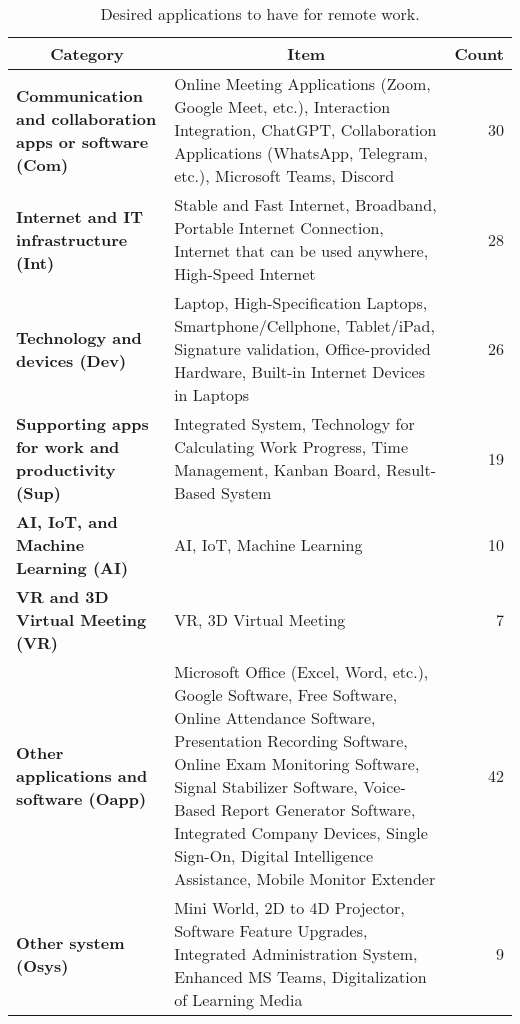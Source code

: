 \documentclass[a4paper, conference]{IEEEtran}
\begin{document}
\begin{table*}
	\centering
	\caption{Desired applications to have for remote work.}
	\label{tab:required_apps_for_remote_work}
	\begin{tabular}{|p{}|p{}|r|}
		\hline
		\multicolumn{1}{|c|}{\textbf{Category}}                                   & \multicolumn{1}{c|}{\textbf{Item}}                                                                                                                                                                                   & \multicolumn{1}{c|}{\textbf{Count}} \\ \hline
		\textbf{Communication  and  collaboration apps or software (Com)} & Online Meeting Applications (Zoom, Google Meet, etc.), Interaction Integration, ChatGPT, Collaboration Applications (WhatsApp, Telegram, etc.), Microsoft Teams, Discord                                                                                     & 30 %
		\\ \hline
		\textbf{Internet and IT infrastructure (Int)} & Stable and Fast Internet, Broadband, Portable Internet Connection, Internet that can be used anywhere, High-Speed Internet & 28 %
		\\ \hline
		\textbf{Technology and devices (Dev)} & Laptop, High-Specification Laptops, Smartphone/Cellphone, Tablet/iPad, Signature validation, Office-provided Hardware, Built-in Internet Devices in Laptops                                                                                                                          & 26 %
		\\ \hline
		\textbf{Supporting apps for work and productivity (Sup)} & Integrated System, Technology for Calculating Work Progress, Time Management, Kanban Board, Result-Based System & 19 %
		\\ \hline
		\textbf{AI, IoT, and  Machine  Learning (AI)} & AI, IoT, Machine Learning
		& 10 %
		\\ \hline
		\textbf{VR and 3D  Virtual Meeting (VR)} & VR, 3D Virtual Meeting & 7%
		\\ \hline
		\textbf{Other applications and software (Oapp)} & Microsoft Office (Excel, Word, etc.), Google Software, Free Software, Online Attendance Software, Presentation Recording Software, Online Exam Monitoring Software, Signal Stabilizer Software, Voice-Based Report Generator Software, Integrated Company Devices, Single Sign-On, Digital Intelligence Assistance, Mobile Monitor Extender & 42 %
		\\ \hline
		\textbf{Other system (Osys)} & Mini World, 2D to 4D Projector, Software Feature Upgrades, Integrated Administration System, Enhanced MS Teams, Digitalization of Learning Media & 9 %
		\\ \hline
	\end{tabular}
\end{table*}
\end{document}
